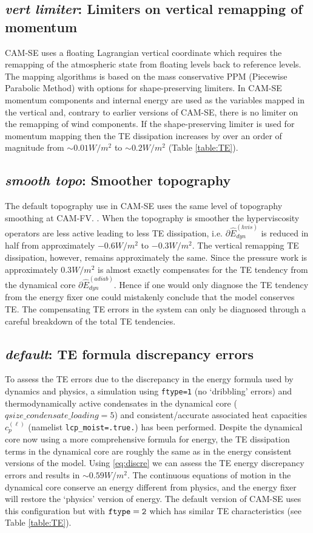 \documentclass{agujournal}
\newcommand*{\gi}[1]{\widehat{#1}}
\begin{document}
\subsection{{\em{vert limiter}}: Limiters on vertical remapping of momentum}\label{sec:ppm}
CAM-SE uses a floating Lagrangian vertical coordinate \citep{S1945JAS,L2004MWR} which requires the remapping of the atmospheric state from floating levels back to reference levels. The mapping algorithms is based on the mass conservative PPM (Piecewise Parabolic Method) with options for shape-preserving limiters. In CAM-SE momentum components and internal energy are used as the variables mapped in the vertical \citep{LetAl2018JAMES} and, contrary to earlier versions of CAM-SE, there is no limiter on the remapping of wind components. If the shape-preserving limiter is used for momentum mapping then the TE dissipation increases by over an order of magnitude from $\sim 0.01W/m^2$ to $\sim 0.2W/m^2$ (Table \ref{table:TE}).
\subsection{{\em{smooth topo}}: Smoother topography}\label{sec:topo}
The default topography use in CAM-SE uses the same level of topography smoothing at CAM-FV. {\color{red}{ask Julio about topo smoothing details: C60 to C92}}. When the topography is smoother the hyperviscosity operators are less active leading to less TE dissipation, i.e. $\partial \gi{E}^{(hvis)}_{dyn}$ is reduced in half from approximately $-0.6W/m^2$ to $-0.3W/m^2$. The vertical remapping TE dissipation, however, remains approximately the same. Since the pressure work is approximately $0.3W/m^2$ is almost exactly compensates for the TE tendency from the dynamical core $\partial \gi{E}^{(adiab)}_{dyn}$. Hence if one would only diagnose the TE tendency from the energy fixer one could mistakenly conclude that the model conserves TE. The compensating TE errors in the system can only be diagnosed through a careful breakdown of the total TE tendencies.
\subsection{{\em{default}}: TE formula discrepancy errors}\label{sec:ediscr}
To assess the TE errors due to the discrepancy in the energy formula used by dynamics and physics, a simulation using {\tt{ftype=1}} (no `dribbling' errors) and thermodynamically active condensates in the dynamical core ($qsize\_condensate\_loading=5$) and consistent/accurate associated heat capacities $c_p^{(\ell)}$ (namelist {\tt{lcp\_moist=.true.}}) has been performed. Despite the dynamical core now using a more comprehensive formula for energy, the TE dissipation terms in the dynamical core are roughly the same as in the energy consistent versions of the model. Using \eqref{eq:discre} we can assess the TE energy discrepancy errors and results in $\sim 0.59W/m^2$. The continuous equations of motion in the dynamical core conserve an energy different from physics, and the energy fixer will restore the `physics' version of energy. The default version of CAM-SE uses this configuration but with $\tt{ftype=2}$ which has similar TE characteristics (see Table \ref{table:TE}).
\end{document}
